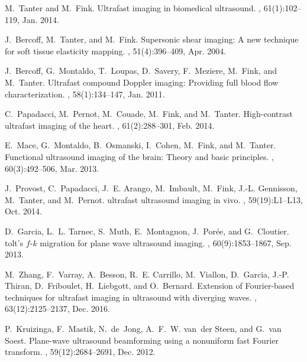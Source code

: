 \documentclass[10pt,twocolumn,romanappendices,final]{IEEEtran}
\begin{document}
\begin{thebibliography}{100}
M.~Tanter and M.~Fink.
\newblock Ultrafast imaging in biomedical ultrasound.
,
  61(1):102--119, Jan. 2014.

J.~Bercoff, M.~Tanter, and M.~Fink.
\newblock Supersonic shear imaging: {A} new technique for soft tissue
  elasticity mapping.
,
  51(4):396--409, Apr. 2004.

J.~Bercoff, G.~Montaldo, T.~Loupas, D.~Savery, F.~Meziere, M.~Fink, and
  M.~Tanter.
\newblock Ultrafast compound {D}oppler imaging: {P}roviding full blood flow
  characterization.
,
  58(1):134--147, Jan. 2011.

C.~Papadacci, M.~Pernot, M.~Couade, M.~Fink, and M.~Tanter.
\newblock High-contrast ultrafast imaging of the heart.
,
  61(2):288--301, Feb. 2014.

E.~Mace, G.~Montaldo, B.~Osmanski, I.~Cohen, M.~Fink, and M.~Tanter.
\newblock Functional ultrasound imaging of the brain: {T}heory and basic
  principles.
,
  60(3):492--506, Mar. 2013.

J.~Provost, C.~Papadacci, J.~E. Arango, M.~Imbault, M.~Fink, J.-L. Gennisson,
  M.~Tanter, and M.~Pernot.
 ultrafast ultrasound imaging in vivo.
, 59(19):L1--L13, Oct. 2014.

D.~Garcia, L.~L. Tarnec, S.~Muth, E.~Montagnon, J.~Porée, and G.~Cloutier.
tolt's {$f$}-{$k$} migration for plane wave ultrasound imaging.
,
  60(9):1853--1867, Sep. 2013.

M.~Zhang, F.~Varray, A.~Besson, R.~E. Carrillo, M.~Viallon, D.~Garcia, J.-P.
  Thiran, D.~Friboulet, H.~Liebgott, and O.~Bernard.
\newblock Extension of {F}ourier-based techniques for ultrafast imaging in
  ultrasound with diverging waves.
,
  63(12):2125--2137, Dec. 2016.

P.~Kruizinga, F.~Mastik, N.~de~Jong, A.~F.~W. van~der Steen, and G.~van Soest.
\newblock Plane-wave ultrasound beamforming using a nonuniform fast {F}ourier
  transform.
,
  59(12):2684--2691, Dec. 2012.


\end{thebibliography}
\end{document}

